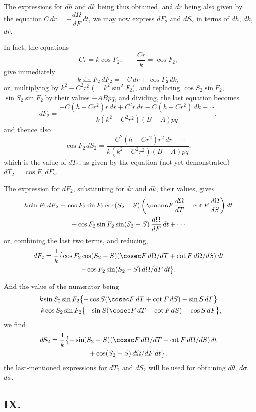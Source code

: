 \documentclass[11pt,a4paper]{book}
\begin{document}
{{The expressions for $dh$ and $dk$ being thus obtained, and $dr$ being also given by the equation $C\,dr = -\dfrac{d\Omega}{dF}\,dt$, we may now express $dF_2$ and $dS_2$ in terms of $dh$, $dk$, $dr$.

In fact, the equations
\[
Cr = k\cos F_2, \qquad \frac{Cr}{k} = \cos F_2,
\]
give immediately
\[
k\sin F_2\,dF_2 = -C\,dr + \cos F_2\,dk,
\]
or, multiplying by $k^2 - C^2r^2$ ($= k^2\sin^2 F_2$), and replacing $\cos S_2\sin F_2$, $\sin S_2\sin F_2$ by their values $-ABpq$, and dividing, the last equation becomes
\[
dF_2 = \frac{-C(h-Cr^2)r\,dr + C^2r\,dr - C(h-Cr^2)\,dk + \cdots}{k(k^2-C^2r^2)(B-A)pq},
\]
and thence also
\[
\cos F_2\,dS_2 = \frac{-C^2(h-Cr^2)r^2\,dr + \cdots}{k(k^2-C^2r^2)(B-A)pq},
\]
which is the value of $dT_2$, as given by the equation (not yet demonstrated) $dT_2 = \cos F_2\,dF_2$.

The expression for $dF_2$, substituting for $dr$ and $dk$, their values, gives
\begin{multline*}
k\sin F_2\,dF_2 = \cos F_2\sin F_2\cos(S_2-S)\left(\cosec F\,\frac{d\Omega}{dT} + \cot F\,\frac{d\Omega}{dS}\right)dt \\
- \cos F_2\sin F_2\sin(S_2-S)\,\frac{d\Omega}{dF}\,dt + \cdots
\end{multline*}
or, combining the last two terms, and reducing,
\begin{multline*}
dF_2 = \frac{1}{k}\bigl\{\cos F_2\cos(S_2-S)(\cosec F\,d\Omega/dT + \cot F\,d\Omega/dS)\,dt \\
- \cos F_2\sin(S_2-S)\,d\Omega/dF\,dt\bigr\}.
\end{multline*}

And the value of the numerator being
\begin{multline*}
k\sin S_2\sin F_2\bigl\{-\cos S(\cosec F\,dT + \cot F\,dS) + \sin S\,dF\bigr\} \\
+ k\cos S_2\sin F_2\bigl\{-\sin S(\cosec F\,dT + \cot F\,dS) - \cos S\,dF\bigr\},
\end{multline*}
we find
\begin{multline*}
dS_2 = \frac{1}{k}\bigl\{-\sin(S_2-S)(\cosec F\,d\Omega/dT + \cot F\,d\Omega/dS)\,dt \\
+ \cos(S_2-S)\,d\Omega/dF\,dt\bigr\};
\end{multline*}
the last-mentioned expressions for $dT_2$ and $dS_2$ will be used for obtaining $d\theta$, $d\sigma$, $d\phi$.

\subsection*{IX.}

}}
\end{document}
